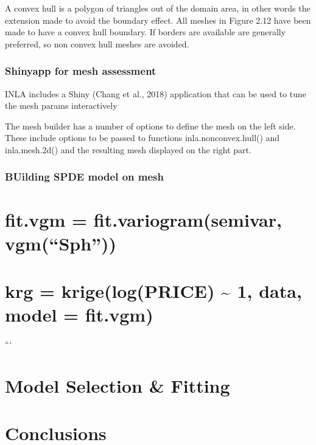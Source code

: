 \documentclass[
  12pt,
  a4paper,
  oneside]{book}
\theoremstyle{definition}
\theoremstyle{definition}
\theoremstyle{definition}
\theoremstyle{remark}
\begin{document}
A convex hull is a polygon of triangles out of the domain area, in other words the extension made to avoid the boundary effect. All meshes in Figure 2.12 have been made to have a convex hull boundary. If borders are available are generally preferred, so non convex hull meshes are avoided.

\hypertarget{shinyapp-for-mesh-assessment}{%
\subsection{Shinyapp for mesh assessment}\label{shinyapp-for-mesh-assessment}}

INLA includes a Shiny (Chang et al., 2018) application that can be used to tune the mesh params interactively

The mesh builder has a number of options to define the mesh on the left side. These include options to be passed to functions inla.nonconvex.hull() and inla.mesh.2d() and the resulting mesh displayed on the right part.

\hypertarget{building-spde-model-on-mesh}{%
\subsection{BUilding SPDE model on mesh}\label{building-spde-model-on-mesh}}

\hypertarget{fit.vgm-fit.variogramsemivar-vgmsph}{%
\chapter{fit.vgm = fit.variogram(semivar, vgm(``Sph''))}\label{fit.vgm-fit.variogramsemivar-vgmsph}}

\hypertarget{krg-krigelogprice-1-data-model-fit.vgm}{%
\chapter{krg = krige(log(PRICE) \textasciitilde{} 1, data, model = fit.vgm)}\label{krg-krigelogprice-1-data-model-fit.vgm}}

```

\hypertarget{modelspec}{%
\chapter{Model Selection \& Fitting}\label{modelspec}}

\hypertarget{application}{%
\chapter{Conclusions}\label{application}}
\end{document}
